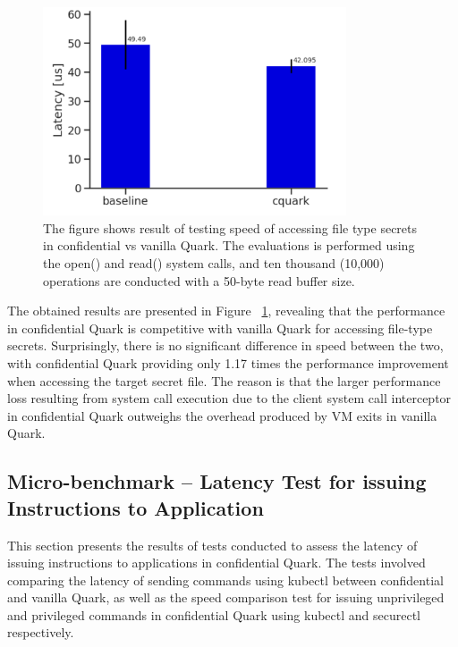 \begin{figure}[H]
    \centering
    \includegraphics[width=0.8\textwidth]{images/reading_speed_of_file_type_secrets_in_Baseline_and_Cquark.PNG}
    \caption[Benchmark result of testing Speed of accessing file type Secrets in confidential Quark vs upstream quark]{The figure shows result of testing speed of accessing file type secrets in confidential vs vanilla Quark. 
    The evaluations is performed using the open() and read() system calls, and ten thousand (10,000) operations are conducted with a 50-byte read buffer size.
    }
    \label{fig:reading_speed_of_file_type_secrets_in_Baseline_and_Cquark}
\end{figure}


The obtained results are presented in Figure ~\ref{fig:reading_speed_of_file_type_secrets_in_Baseline_and_Cquark}, revealing that the performance  in confidential Quark is competitive with vanilla Quark for accessing file-type secrets. Surprisingly, there is no significant difference in speed
between the two, with confidential Quark providing only 1.17 times the performance improvement when accessing the target secret file.  The reason is that the larger performance loss resulting from system call execution due to the client system call interceptor in confidential Quark outweighs the overhead produced by VM exits in vanilla Quark.


\subsection{Micro-benchmark – Latency Test for issuing Instructions to Application}\label{bench_issuing_Instructions}

This section presents the results of tests conducted to assess the latency of issuing instructions to applications in confidential Quark. The tests involved comparing the latency of sending commands using kubectl between confidential and vanilla Quark, as well as the speed comparison test for issuing unprivileged 
and privileged commands in confidential Quark using kubectl and securectl respectively.


